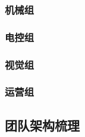         \subsubsection{机械组}

        \subsubsection{电控组}

        \subsubsection{视觉组}

        \subsubsection{运营组}

    \subsection{团队架构梳理}
    